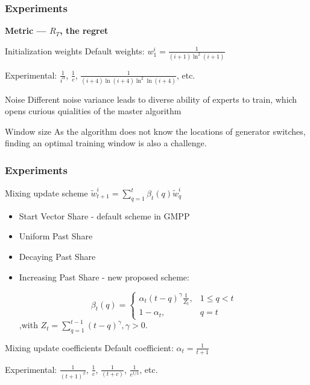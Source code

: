 \documentclass{beamer}
\begin{document}
\begin{frame}
\frametitle{Experiments}

\textbf{Metric --- $R_T$,  the regret}
\begin{block}{Initialization weights}
Default weights: $w_1^i = \frac{1}{(i+1)\ln^2(i+1)}$

Experimental:  $\frac{1}{i^\alpha}$, $\frac1c$,  $\frac{1}{(i+4)\ln(i+4)\ln^2\ln(i+4)}$, etc.
\end{block}

\begin{block}{Noise}
Different noise variance leads to diverse ability of experts to train, which opens curious quialities of the master algorithm
\end{block}

\begin{block}{Window size}
As the algorithm does not know the locations of generator switches, finding an optimal training window is also a challenge.
\end{block}

\end{frame}


\begin{frame}
\frametitle{Experiments}

\begin{block}{Mixing update scheme}
$ \widetilde{w}_{t+1}^i = \sum_{q=1}^t\beta_t(q)\widetilde{w}_q^i  $
\begin{itemize}
\item Start Vector Share - default scheme in GMPP
\item Uniform Past Share
\item Decaying Past Share
\item Increasing Past Share - new proposed scheme:

 \[\beta_t(q) =
    \begin{cases}
    \alpha_t(t-q)^\gamma\frac{1}{Z_t}, & 1 \le q < t \\
    1 - \alpha_t, & q = t
    \end{cases}\]
    \hfill ,with $Z_t = \sum_{q=1}^{t-1}(t-q)^\gamma, \gamma > 0$. 
\end{itemize}


\end{block}

\begin{block}{Mixing update coefficients}
Default coefficient: $\alpha_t = \frac{1}{t+1}$

Experimental:  $\frac{1}{(t+1)^\beta}$, $\frac{1}{c}$, $\frac{1}{(t+c)}$, $\frac{1}{e^{t/3}}$, etc.

\end{block}

\end{frame}
\end{document}
